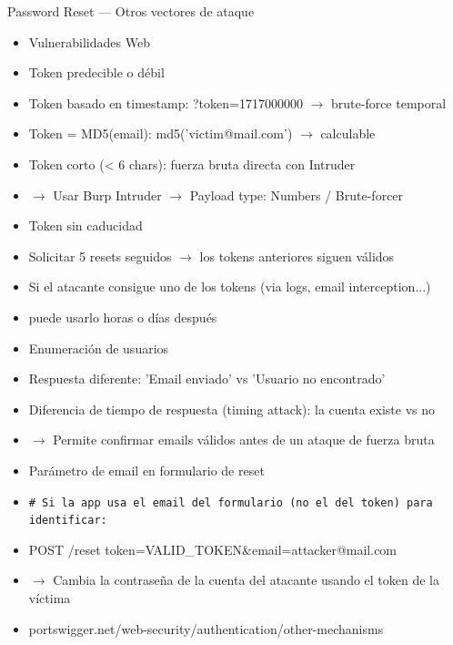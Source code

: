 \documentclass[aspectratio=169,10pt]{beamer}
\newcommand{\cmd}[1]{\texttt{\color{uznavy}#1}}
\begin{document}
\begin{frame}[allowframebreaks]{Password Reset --- Otros vectores de ataque}
\small
  \begin{itemize}
  \item Vulnerabilidades Web
  \item Token predecible o débil
  \item Token basado en timestamp: ?token=1717000000 $\rightarrow$ brute-force temporal
  \item Token = MD5(email): md5('victim@mail.com') $\rightarrow$ calculable
  \item Token corto (\textless{} 6 chars): fuerza bruta directa con Intruder
  \item $\rightarrow$ Usar Burp Intruder $\rightarrow$ Payload type: Numbers / Brute-forcer
  \item Token sin caducidad
  \item Solicitar 5 resets seguidos $\rightarrow$ los tokens anteriores siguen válidos
  \item Si el atacante consigue uno de los tokens (via logs, email interception...)
  \item puede usarlo horas o días después
  \item Enumeración de usuarios
  \item Respuesta diferente: 'Email enviado' vs 'Usuario no encontrado'
  \item Diferencia de tiempo de respuesta (timing attack): la cuenta existe vs no
  \item $\rightarrow$ Permite confirmar emails válidos antes de un ataque de fuerza bruta
  \item Parámetro de email en formulario de reset
  \item \cmd{\# Si la app usa el email del formulario (no el del token) para identificar:}
  \item POST /reset token=VALID\_TOKEN\&email=attacker@mail.com
  \item $\rightarrow$ Cambia la contraseña de la cuenta del atacante usando el token de la víctima
  \item portswigger.net/web-security/authentication/other-mechanisms
  \end{itemize}
\end{frame}
\end{document}
